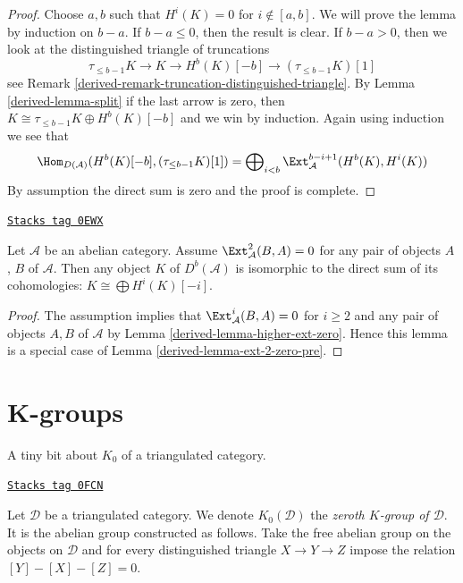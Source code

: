 \begin{proof}

Choose $a, b$ such that $H^i(K) = 0$ for $i \not \in [a, b]$.
We will prove the lemma by induction on $b - a$. If $b - a \leq 0$,
then the result is clear. If $b - a > 0$, then we look at the
distinguished triangle of truncations
$$
\tau_{\leq b - 1}K \to K \to H^b(K)[-b] \to (\tau_{\leq b - 1}K)[1]
$$
see Remark \ref{derived-remark-truncation-distinguished-triangle}.
By Lemma \ref{derived-lemma-split} if the last arrow is zero, then
$K \cong \tau_{\leq b - 1}K \oplus H^b(K)[-b]$ and we win
by induction. Again using induction we see that
$$
\Hom_{D(\mathcal{A})}(H^b(K)[-b], (\tau_{\leq b - 1}K)[1]) =
\bigoplus\nolimits_{i < b} \Ext_\mathcal{A}^{b - i + 1}(H^b(K), H^i(K))
$$
By assumption the direct sum is zero and the proof is complete.
\end{proof}

\begin{lemma}
\label{derived-lemma-ext-2-zero}
\href{https://stacks.math.columbia.edu/tag/0EWX}{\texttt{Stacks tag 0EWX}}

Let $\mathcal{A}$ be an abelian category. Assume $\Ext^2_\mathcal{A}(B, A) = 0$
for any pair of objects $A$, $B$ of $\mathcal{A}$.
Then any object $K$ of $D^b(\mathcal{A})$ is isomorphic to the direct
sum of its cohomologies: $K \cong \bigoplus H^i(K)[-i]$.
\end{lemma}

\begin{proof}

The assumption implies that $\Ext^i_\mathcal{A}(B, A) = 0$ for $i \geq 2$
and any pair of objects $A, B$ of $\mathcal{A}$ by
Lemma \ref{derived-lemma-higher-ext-zero}. Hence this lemma is a special
case of Lemma \ref{derived-lemma-ext-2-zero-pre}.
\end{proof}

\section{K-groups}
\label{derived-section-K-groups}
A tiny bit about $K_0$ of a triangulated category.

\begin{definition}[K zero]
\label{derived-definition-K-zero}
\href{https://stacks.math.columbia.edu/tag/0FCN}{\texttt{Stacks tag 0FCN}}

Let $\mathcal{D}$ be a triangulated category. We denote $K_0(\mathcal{D})$ the
{\it zeroth $K$-group of $\mathcal{D}$}. It is the abelian group constructed
as follows. Take the free abelian group on the objects on $\mathcal{D}$
and for every distinguished triangle $X \to Y \to Z$
impose the relation $[Y] - [X] - [Z] = 0$.
\end{definition}

